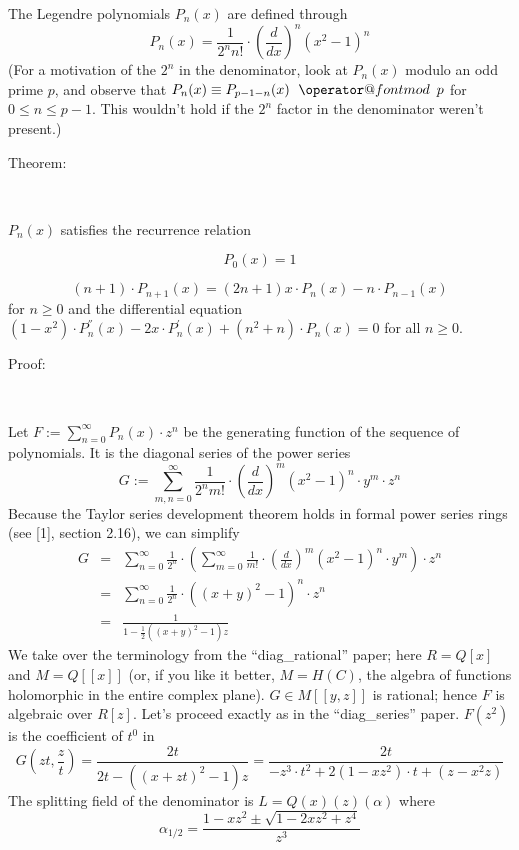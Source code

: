 \documentclass[12pt,a4paper,oneside,onecolumn]{article}
\makeatletter
\def\mod#1{\allowbreak \mkern8mu \mathop{\operator@font mod}\,\,{#1}}
\makeatother
\begin{document}
The Legendre polynomials  \( P_{n}(x) \) are defined through 
\[
P_{n}(x)=\frac{1}{2^{n}n!}\cdot \left( \frac{d}{dx}\right) ^{n}(x^{2}-1)^{n}\]
(For a motivation
of the  \( 2^{n} \) in the denominator, look at  \( P_{n}(x) \) modulo an odd prime  \( p \), and
observe that  \( P_{n}(x)\equiv P_{p-1-n}(x)\mod p \) for  \( 0\leq n\leq p-1 \). This wouldn't hold if the  \( 2^{n} \) factor in the denominator
weren't present.)

\begin{description}

\item [Theorem:]~

\end{description}

 \( P_{n}(x) \) satisfies the recurrence relation


\[
P_{0}(x)=1\]



\[
(n+1)\cdot P_{n+1}(x)=(2n+1)x\cdot P_{n}(x)-n\cdot P_{n-1}(x)\]
for  \( n\geq 0 \) and the differential equation  \( (1-x^{2})\cdot P_{n}^{''}(x)-2x\cdot P_{n}^{'}(x)+(n^{2}+n)\cdot P_{n}(x)=0 \) for all  \( n\geq 0 \).

\begin{description}

\item [Proof:]~

\end{description}

Let  \( F:=\sum ^{\infty }_{n=0}P_{n}(x)\cdot z^{n} \) be the generating function of the sequence of polynomials. It
is the diagonal series of the power series
\[
G:=\sum _{m,n=0}^{\infty }\frac{1}{2^{n}m!}\cdot \left( \frac{d}{dx}\right) ^{m}(x^{2}-1)^{n}\cdot y^{m}\cdot z^{n}\]
Because the Taylor series
development theorem holds in formal power series rings (see [1], section
2.16), we can simplify
\begin{eqnarray*}
G & = & \sum _{n=0}^{\infty }\frac{1}{2^{n}}\cdot \left( \sum _{m=0}^{\infty }\frac{1}{m!}\cdot \left( \frac{d}{dx}\right) ^{m}(x^{2}-1)^{n}\cdot y^{m}\right) \cdot z^{n}\\
 & = & \sum _{n=0}^{\infty }\frac{1}{2^{n}}\cdot \left( (x+y)^{2}-1\right) ^{n}\cdot z^{n}\\
 & = & \frac{1}{1-\frac{1}{2}\left( (x+y)^{2}-1\right) z}
\end{eqnarray*}
We take over the terminology from the ``diag\_rational''
paper; here  \( R=Q[x] \) and  \( M=Q[[x]] \) (or, if you like it better,  \( M=H(C) \), the algebra of
functions holomorphic in the entire complex plane).  \( G\in M[[y,z]] \) is rational;
hence  \( F \) is algebraic over  \( R[z] \). Let's proceed exactly as in the ``diag\_series''
paper.  \( F(z^{2}) \) is the coefficient of  \( t^{0} \) in
\[
G(zt,\frac{z}{t})=\frac{2t}{2t-\left( (x+zt)^{2}-1\right) z}=\frac{2t}{-z^{3}\cdot t^{2}+2(1-xz^{2})\cdot t+(z-x^{2}z)}\]
The splitting field of the denominator
is  \( L=Q(x)(z)(\alpha ) \) where 
\[
\alpha _{1/2}=\frac{1-xz^{2}\pm \sqrt{1-2xz^{2}+z^{4}}}{z^{3}}\]
\end{document}
